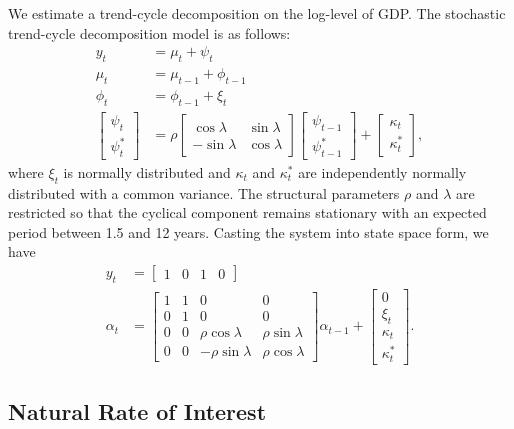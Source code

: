 \documentclass{article}
\begin{document}
We estimate a trend-cycle decomposition on the log-level of GDP. The stochastic trend-cycle decomposition model is as follows:
  \begin{align*}
  y_t &= \mu_t + \psi_t \\
  \mu_t &= \mu_{t-1} + \phi_{t-1} \\
  \phi_t &= \phi_{t-1} + \xi_t \\
  \begin{bmatrix} \psi_t \\ \psi_t^* \end{bmatrix} &=
  \rho \begin{bmatrix} \cos \lambda & \sin \lambda \\ -\sin \lambda & \cos \lambda \end{bmatrix}
  \begin{bmatrix} \psi_{t-1} \\ \psi_{t-1}^* \end{bmatrix} +
  \begin{bmatrix} \kappa_t \\ \kappa_t^* \end{bmatrix},
  \end{align*}
where $\xi_t$ is normally distributed and $\kappa_t$ and $\kappa_t^*$ are independently normally distributed with a common variance. The structural parameters $\rho$ and $\lambda$ are restricted so that the cyclical component remains stationary with an expected period between 1.5 and 12 years. Casting the system into state space form, we have
  \begin{align*}
  y_t &= \begin{bmatrix} 1 & 0 & 1 & 0 \end{bmatrix} \\
  \alpha_t &=
  \begin{bmatrix} 1 & 1 & 0 & 0 \\ 0 & 1 & 0 & 0 \\ 0 & 0 & \rho \cos \lambda & \rho \sin \lambda \\ 0 & 0 & -\rho \sin \lambda & \rho \cos \lambda \end{bmatrix} \alpha_{t-1} +
  \begin{bmatrix} 0 \\ \xi_t \\ \kappa_t \\ \kappa_t^* \end{bmatrix}.
  \end{align*}


\subsection{Natural Rate of Interest}
\end{document}
